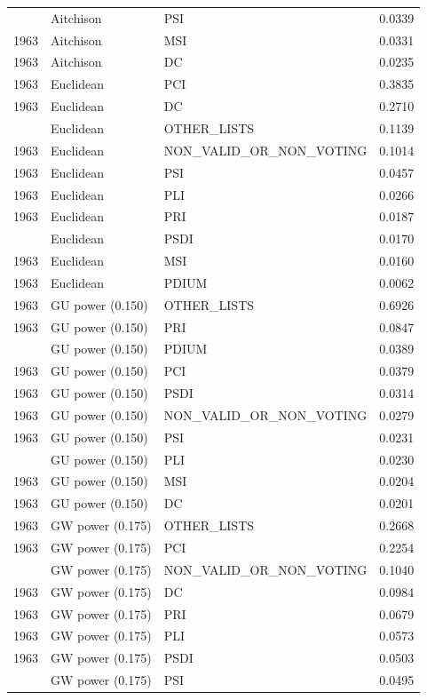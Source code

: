 \begin{longtable}[t]{rllr}
\addlinespace
1963 & Aitchison & PSI & 0.0339\\
1963 & Aitchison & MSI & 0.0331\\
1963 & Aitchison & DC & 0.0235\\
1963 & Euclidean & PCI & 0.3835\\
1963 & Euclidean & DC & 0.2710\\
\addlinespace
1963 & Euclidean & OTHER\_LISTS & 0.1139\\
1963 & Euclidean & NON\_VALID\_OR\_NON\_VOTING & 0.1014\\
1963 & Euclidean & PSI & 0.0457\\
1963 & Euclidean & PLI & 0.0266\\
1963 & Euclidean & PRI & 0.0187\\
\addlinespace
1963 & Euclidean & PSDI & 0.0170\\
1963 & Euclidean & MSI & 0.0160\\
1963 & Euclidean & PDIUM & 0.0062\\
1963 & GU power (0.150) & OTHER\_LISTS & 0.6926\\
1963 & GU power (0.150) & PRI & 0.0847\\
\addlinespace
1963 & GU power (0.150) & PDIUM & 0.0389\\
1963 & GU power (0.150) & PCI & 0.0379\\
1963 & GU power (0.150) & PSDI & 0.0314\\
1963 & GU power (0.150) & NON\_VALID\_OR\_NON\_VOTING & 0.0279\\
1963 & GU power (0.150) & PSI & 0.0231\\
\addlinespace
1963 & GU power (0.150) & PLI & 0.0230\\
1963 & GU power (0.150) & MSI & 0.0204\\
1963 & GU power (0.150) & DC & 0.0201\\
1963 & GW power (0.175) & OTHER\_LISTS & 0.2668\\
1963 & GW power (0.175) & PCI & 0.2254\\
\addlinespace
1963 & GW power (0.175) & NON\_VALID\_OR\_NON\_VOTING & 0.1040\\
1963 & GW power (0.175) & DC & 0.0984\\
1963 & GW power (0.175) & PRI & 0.0679\\
1963 & GW power (0.175) & PLI & 0.0573\\
1963 & GW power (0.175) & PSDI & 0.0503\\
\addlinespace
1963 & GW power (0.175) & PSI & 0.0495\\

\end{longtable}

